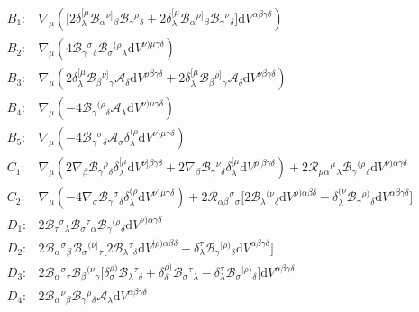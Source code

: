 \documentclass{article}
\providecommand{\Rie}[3]{\mathcal{R}_{#1}{}^{ #2}{}_{#3}}
\providecommand{\B}[3]{\mathcal{B}_{#1}{}^{ #2}{}_{#3}}
\providecommand{\A}[1]{\mathcal{A}_{#1}}
\providecommand{\deV}[1]{\mathrm{d}V^{#1}}
\begin{document}
\begin{align*}
    B_1: & \nabla_\mu \left(\Big[ 2\delta^{[\mu}_\lambda \B{\alpha}{\nu]}{\beta}\B{\gamma}{\rho}{\delta} + 2 \delta^{[\mu}_\lambda \B{\alpha}{\rho]}{\beta} \B{\gamma}{\nu}{\delta} \Big]\deV{\alpha\beta\gamma\delta}\right)\\
    B_2: & \nabla_\mu \left(4 \B{\gamma}{\sigma}{\delta} \B{\sigma}{(\rho}{\lambda} \deV{\nu)\mu\gamma\delta}\right) \\
    B_3: & \nabla_\mu \left(2 \delta^{[\mu}_\lambda \B{\beta}{\nu]}{\gamma} \A{\delta} \deV{\rho\beta\gamma\delta} + 2 \delta^{[\mu}_\lambda \B{\beta}{\rho]}{\gamma} \A{\delta}\deV{\nu\beta\gamma\delta}\right) \\
    B_4: & \nabla_\mu \left(-4 \B{\gamma}{(\rho}{\delta} \A{\lambda} \deV{\nu)\mu\gamma\delta}\right) \\
    B_5: & \nabla_\mu \left(-4 \B{\gamma}{\sigma}{\delta} \A{\sigma} \delta^{(\rho}_\lambda\deV{\nu)\mu\gamma\delta}\right)\\
    C_1: & \nabla_\mu \left(2 \nabla_\beta \B{\gamma}{\rho}{\delta} \delta^{[\mu}_\lambda \deV{\nu]\beta\gamma\delta} + 2 \nabla_\beta \B{\gamma}{\nu}{\delta} \delta^{[\mu}_\lambda \deV{\rho]\beta\gamma\delta}\right) + 2 \Rie{\mu\alpha}{\mu}{\lambda} \B{\gamma}{(\rho}{\delta} \deV{\nu)\alpha\gamma\delta} \\ 
    C_2: & \nabla_\mu \left(-4 \nabla_\sigma \B{\gamma}{\sigma}{\delta} \delta^{(\rho}_\lambda \deV{\nu)\mu\gamma\delta}\right) + 2 \Rie{\alpha\beta}{\sigma}{\sigma} \Big[ 2 \B{\lambda}{(\nu}{\delta} \deV{\rho)\alpha\beta\delta} - \delta^{(\nu}_\lambda \B{\gamma}{\rho)}{\delta} \deV{\alpha\beta\gamma\delta}\Big]\\
    D_1: & 2 \B{\tau}{\sigma}{\lambda} \B{\sigma}{\tau}{\alpha} \B{\gamma}{(\rho}{\delta}\deV{\nu)\alpha\gamma\delta} \\
    D_2: & 2 \B{\alpha}{\sigma}{\beta} \B{\sigma}{(\nu\vert}{\tau} \Big[ 2 \B{\lambda}{\tau}{\delta}\deV{\vert\rho)\alpha\beta\delta} - \delta^{\tau}_\lambda \B{\gamma}{\vert\rho)}{\delta}\deV{\alpha\beta\gamma\delta} \Big] \\
    D_3: & 2 \B{\alpha}{\sigma}{\tau} \B{\beta}{(\nu}{\gamma} \Big[\delta^{\rho)}_\sigma \B{\lambda}{\tau}{\delta} + \delta^{\rho)}_\delta \B{\sigma}{\tau}{\lambda} - \delta^\tau_\lambda \B{\sigma}{|\rho)}{\delta} \Big] \deV{\alpha\beta\gamma\delta} \\
    D_4: & 2\B{\alpha}{\nu}{\beta} \B{\gamma}{\rho}{\delta} \A{\lambda} \deV{\alpha\beta\gamma\delta} \\

\end{align*}
\end{document}
